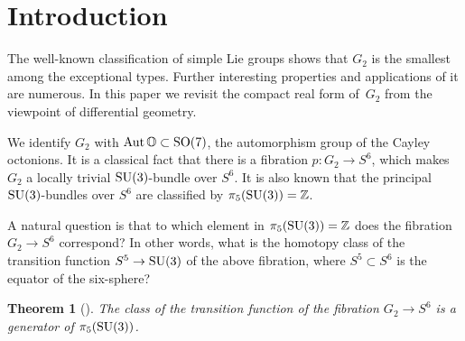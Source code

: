 \documentclass[pdftex]{sigma}
\numberwithin{equation}{section}
\newtheorem{Theorem}{Theorem}[section]
\DeclareMathOperator{\Aut}{Aut}
\newcommand{\SZ}{\mathbb{Z}} %
\newcommand{\SO}{\mathbb{O}} %
\begin{document}
\allowdisplaybreaks

\newcommand{\arXivNumber}{1811.03613}

\renewcommand{\PaperNumber}{078}

\FirstPageHeading










\section{Introduction}

The well-known classification of simple Lie groups shows that $G_2$ is the smallest among the exceptional types. Further interesting properties and applications of it are numerous. In this paper we revisit the compact real form of~$G_2$ from the viewpoint of differential geometry.

We identify $G_2$ with $ \Aut \SO \subset {\rm SO}(7)$, the automorphism group of the Cayley octonions. It is a classical fact that there is a fibration $p\colon G_2 \rightarrow S^6$, which makes $G_2$ a locally trivial ${\rm SU}(3)$-bundle over $S^6$. It is also known that the principal ${\rm SU}(3)$-bundles over $S^6$ are classified by $\pi_5({\rm SU}(3))=\SZ $.

A natural question is that to which element in $\pi_5({\rm SU}(3))=\SZ $ does the fibration $G_2 \rightarrow S^6$ correspond? In other words, what is the homotopy class of the transition function $S^5 \rightarrow {\rm SU}(3)$ of the above fibration, where $S^5 \subset S^6$ is the equator of the six-sphere?
\begin{Theorem}[{\cite[Proposition~2]{chaves96complex}}]\label{thm:transfun}
 The class of the transition function of the fibration $G_2 \rightarrow S^6$ is a generator of $\pi_{5}({\rm SU}(3))$.
\end{Theorem}
\end{document}
